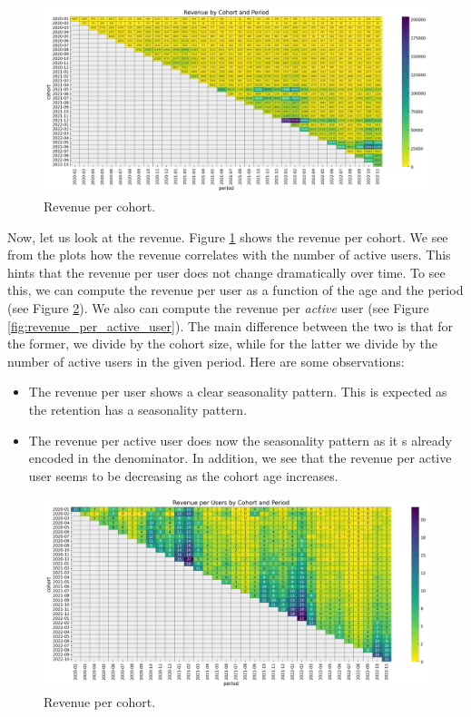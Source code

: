 \documentclass[11pt]{amsart}
\theoremstyle{definition}
\begin{document}
\begin{figure}
    \centering
    \includegraphics[width=\textwidth]{images/revenue_retention_23_0.png}
    \caption{Revenue per cohort.}
    \label{fig:revenue}
\end{figure}

Now, let us look at the revenue. Figure \ref{fig:revenue} shows the revenue per cohort. 
We see from the plots how the revenue correlates with the number of active users. This 
hints that the revenue per user does not change dramatically over time. To see this,
we can compute the revenue per user as a function of the age and the period (see Figure
\ref{fig:revenue_per_user}). We also can compute the revenue per {\em active} user (see
Figure \ref{fig:revenue_per_active_user}). The main difference between the two is that
for the former, we divide by the cohort size, while for the latter we divide by the
number of active users in the given period. Here are some observations:

\begin{itemize}
    \item The revenue per user shows a clear seasonality pattern. This is expected as
        the retention has a seasonality pattern.
    \item The revenue per active user does now the seasonality pattern as it s already
        encoded in the denominator. In addition, we see that the revenue per active user
        seems to be decreasing as the cohort age increases.
\end{itemize}

\begin{figure}
    \centering
    \includegraphics[width=\textwidth]{images/revenue_retention_27_0.png}
    \caption{Revenue per cohort.}
    \label{fig:revenue_per_user}
\end{figure}
\end{document}
